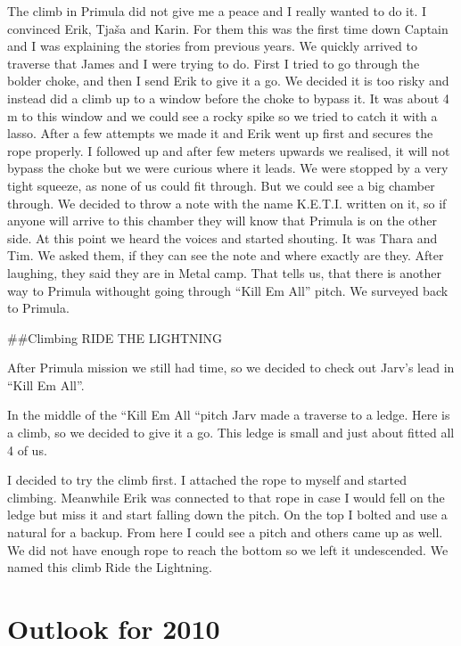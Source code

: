 The climb in Primula did not give me a peace and I really wanted to do
it. I convinced Erik, Tjaša and Karin. For them this was the first time
down Captain and I was explaining the stories from previous years. We
quickly arrived to traverse that James and I were trying to do. First I
tried to go through the bolder choke, and then I send Erik to give it a
go. We decided it is too risky and instead did a climb up to a window
before the choke to bypass it. It was about 4 m to this window and we
could see a rocky spike so we tried to catch it with a lasso. After a
few attempts we made it and Erik went up first and secures the rope
properly. I followed up and after few meters upwards we realised, it
will not bypass the choke but we were curious where it leads. We were
stopped by a very tight squeeze, as none of us could fit through. But we
could see a big chamber through. We decided to throw a note with the
name K.E.T.I. written on it, so if anyone will arrive to this chamber
they will know that Primula is on the other side. At this point we heard
the voices and started shouting. It was Thara and Tim. We asked them, if
they can see the note and where exactly are they. After laughing, they
said they are in Metal camp. That tells us, that there is another way to
Primula withought going through ``Kill Em All'' pitch. We surveyed back
to Primula.

\attrib{\izi}

\#\#Climbing RIDE THE LIGHTNING

After Primula mission we still had time, so we decided to check out
Jarv's lead in ``Kill Em All''.

In the middle of the ``Kill Em All ``pitch Jarv made a traverse to a
ledge. Here is a climb, so we decided to give it a go. This ledge is
small and just about fitted all 4 of us.

I decided to try the climb first. I attached the rope to myself and
started climbing. Meanwhile Erik was connected to that rope in case I
would fell on the ledge but miss it and start falling down the pitch. On
the top I bolted and use a natural for a backup. From here I could see a
pitch and others came up as well. We did not have enough rope to reach
the bottom so we left it undescended. We named this climb Ride the
Lightning.

\attrib{\izi}

\hypertarget{outlook-for-2010}{%
\section{Outlook for 2010}\label{outlook-for-2010}}

